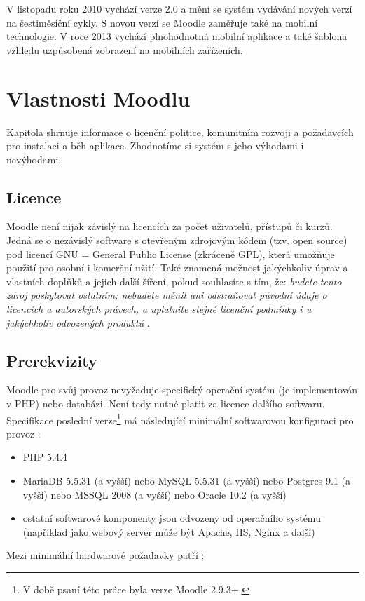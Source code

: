 \documentclass[
print,
  11pt,
  table,   
  nolof,    
  nolot,
  oneside,
  draft
]{fithesis3}
\begin{document}
V listopadu roku 2010 vychází verze 2.0 a mění se systém vydávání nových verzí na šestiměsíční cykly. S novou verzí se Moodle zaměřuje také na mobilní technologie. V roce 2013 vychází plnohodnotná mobilní aplikace a také šablona vzhledu uzpůsobená zobrazení na mobilních zařízeních.

		

	\section{Vlastnosti Moodlu}
Kapitola shrnuje informace o licenční politice, komunitním rozvoji a požadavcích pro instalaci a běh aplikace. Zhodnotíme si systém s jeho výhodami i nevýhodami.
		\subsection{Licence}
Moodle není nijak závislý na licencích za počet uživatelů, přístupů či kurzů. Jedná se o nezávislý software s otevřeným zdrojovým kódem (tzv. open source) pod licencí GNU = General Public License (zkráceně GPL), která umožňuje použití pro osobní i komerční užití. Také znamená možnost jakýchkoliv úprav a vlastních doplňků a jejich další šíření, pokud souhlasíte s tím, že: \emph{budete tento zdroj poskytovat ostatním; nebudete měnit ani odstraňovat původní údaje o licencích a autorských právech, a uplatníte stejné licenční podmínky i u jakýchkoliv odvozených produktů} \cite{moodle-what-is}. 
		\subsection{Prerekvizity}
Moodle pro svůj provoz nevyžaduje specifický operační systém (je implementován v PHP) nebo databázi. Není tedy nutné platit za licence dalšího softwaru. Specifikace poslední verze\footnote{V době psaní této práce byla verze Moodle 2.9.3+.}  má následující minimální softwarovou konfiguraci pro provoz \cite{softprereq}:
\begin{itemize}
\item PHP 5.4.4
\item MariaDB 5.5.31 (a vyšší) nebo MySQL 5.5.31 (a vyšší) nebo Postgres 9.1 (a vyšší) nebo MSSQL 2008 (a vyšší) nebo Oracle 10.2 (a vyšší)
\item ostatní softwarové komponenty jsou odvozeny od operačního systému (například jako webový server může být Apache, IIS, Nginx a další) 
\end{itemize}

Mezi minimální hardwarové požadavky patří \cite{hardprereq}:
\end{document}

